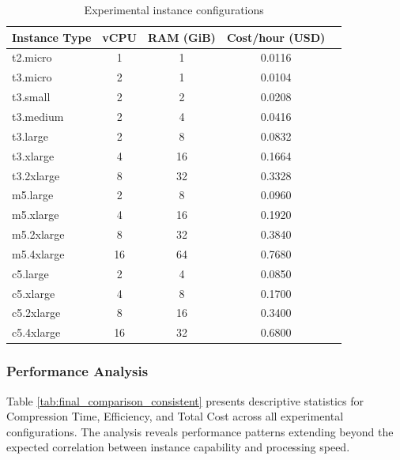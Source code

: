\documentclass[conference]{IEEEtran}
\begin{document}
	\begin{table}[H]
		\centering
		\caption{Experimental instance configurations}
		\label{tab:experimental_configurations}
		\begin{tabular}{|l|c|c|c|c|}
			\hline
			\textbf{Instance Type} & \textbf{vCPU} & \textbf{RAM (GiB)} & \textbf{Cost/hour (USD)}  \\
			\hline
			t2.micro & 1 & 1 & 0.0116  \\
			t3.micro & 2 & 1 & 0.0104 \\
			t3.small & 2 & 2 & 0.0208 \\
			t3.medium & 2 & 4 & 0.0416 \\
			t3.large & 2 & 8 & 0.0832 \\
			t3.xlarge & 4 & 16 & 0.1664 \\
			t3.2xlarge & 8 & 32 & 0.3328 \\
			\hline
			m5.large & 2 & 8 & 0.0960 \\
			m5.xlarge & 4 & 16 & 0.1920 \\
			m5.2xlarge & 8 & 32 & 0.3840 \\
			m5.4xlarge & 16 & 64 & 0.7680 \\
			\hline
			c5.large & 2 & 4 & 0.0850 \\
			c5.xlarge & 4 & 8 & 0.1700 \\
			c5.2xlarge & 8 & 16 & 0.3400 \\
			c5.4xlarge & 16 & 32 & 0.6800 \\
			\hline
		\end{tabular}
	\end{table}
	
	\subsubsection{Performance Analysis}
	
	Table \ref{tab:final_comparison_consistent} presents descriptive statistics for Compression Time, Efficiency, and Total Cost across all experimental configurations. The analysis reveals performance patterns extending beyond the expected correlation between instance capability and processing speed.
	
\end{document}
